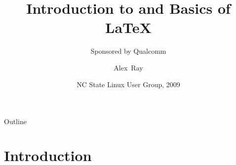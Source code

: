 \documentclass{beamer}
\title[Overview of \LaTeX] %
{Introduction to and Basics of \LaTeX}
\subtitle
{Sponsored by Qualcomm}
\author[Alex Ray] %
{Alex~Ray\inst{1}}
\institute[North Carolina State University] %
{
  \inst{1}%
  College of Textiles\\
  North Carolina State University}
\date[NCSU LUG 2009] %
{NC State Linux User Group, 2009}
\begin{document}
\begin{frame}
  \titlepage
\end{frame}

\begin{frame}{Outline}
  \tableofcontents
\end{frame}





\section{Introduction}
\end{document}

